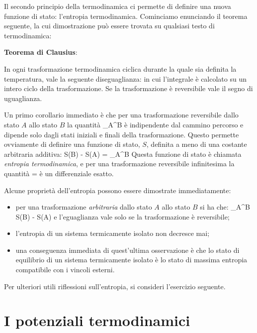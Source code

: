 Il secondo principio della termodinamica ci permette di definire una nuova funzione di stato: l'entropia termodinamica. Cominciamo enunciando il teorema seguente, la cui dimostrazione può essere trovata su qualsiasi testo di termodinamica:

\textbf{Teorema di Clausius}:\par
In ogni trasformazione termodinamica ciclica durante la quale sia definita la temperatura, vale la seguente diseguaglianza:
\be
\label{eq:01-ointciclo}
\oint {} 
\ee
in cui l'integrale è calcolato su un intero ciclo della trasformazione. Se la trasformazione è reversibile vale il segno di uguaglianza.

Un primo corollario immediato è che per una trasformazione reversibile dallo stato $A$ allo stato $B$ la quantità
\be
\label{eq:01-intab}
\int_{A}^{B} 
\ee
è indipendente dal cammino percorso e dipende solo dagli stati iniziali e finali della trasformazione. Questo permette ovviamente di definire una funzione di stato, $S$, definita a meno di una costante arbitraria additiva:
\be
\label{eq:01-entropia-termodinamica}
S(B) - S(A) = \int_{A}^{B} 
\ee
Questa funzione di stato è chiamata {\em entropia termodinamica}, e per una trasformazione reversibile infinitesima la quantità
\be
\label{eq:01-dentropia}
 = 
\ee
è un differenziale esatto.

Alcune proprietà dell'entropia possono essere dimostrate immediatamente:
\begin{itemize}
	\item per una trasformazione {\em arbitraria} dallo stato $A$ allo stato $B$ si ha che:
	\be
	\label{eq:01-disentro}\int_{A}^{B}  \le S(B) - S(A)
	\ee
	e l'eguaglianza vale solo se la trasformazione è reversibile;
	\item l'entropia di un sistema termicamente isolato non decresce mai;
	\item una conseguenza immediata di quest'ultima osservazione è che lo stato di equilibrio di un sistema termicamente isolato è lo stato di massima entropia compatibile con i vincoli esterni.
\end{itemize}
Per ulteriori utili riflessioni sull'entropia, si consideri l'esercizio seguente.

\section{I potenziali termodinamici}
\label{sec:01-potenziali}

